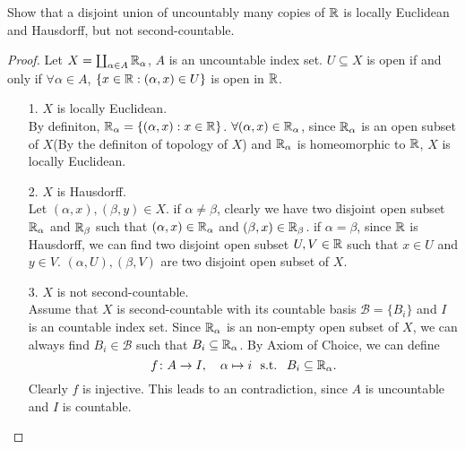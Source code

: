 \begin{problem}
  Show that a disjoint union of uncountably many copies of $\mathbb{R}$ is locally Euclidean and Hausdorff, but not second-countable.
  \begin{proof}
    Let $ X = \coprod_{\alpha \in A}\mathbb{R}_\alpha $, $ A $ is an uncountable index set. $ U \subseteq X $ is open if and only if $ \forall \alpha \in A$, $ \{x\in \mathbb{R}: (\alpha,x)\in U\}$ is open in $\mathbb{R}$.
    \begin{enumerate}
      \item[1.] $X$ is locally Euclidean. \\
      By definiton, $\mathbb{R}_\alpha = \{(\alpha,x): x \in \mathbb{R}\}$. $\forall (\alpha, x) \in \mathbb{R}_\alpha$,  since $\mathbb{R}_\alpha$ is an open subset of $X$(By the definiton of topology of $X$) and $\mathbb{R}_\alpha$ is homeomorphic to $\mathbb{R}$, $X$ is locally Euclidean.
      
      \item[2.] $X$ is Hausdorff. \\
      Let $(\alpha,x),(\beta,y) \in X$. if $\alpha \neq \beta$, clearly we have two disjoint open subset $\mathbb{R}_\alpha$ and $\mathbb{R}_\beta$ such that 
      $ (\alpha,x) \in \mathbb{R}_\alpha $ and $ (\beta,x) \in \mathbb{R}_\beta $. if $\alpha = \beta$, since $\mathbb{R}$ is Hausdorff, we can find two disjoint open subset $U,V \in \mathbb{R}$ such that $x \in U $ and $y \in V$. $(\alpha,U),(\beta,V)$ are two disjoint open subset of $X$.
      
      \item[3.] $X$ is not second-countable. \\
      Assume that $X$ is second-countable with its countable basis $\mathcal{B}=\{B_i\}$ and $I$ is an countable index set. Since $\mathbb{R}_\alpha$ is an non-empty open subset of $X$, we can always find $B_i \in \mathcal{B}$ such that $B_i \subseteq \mathbb{R}_\alpha$. By Axiom of Choice, we can define 
      $$ f \colon A \rightarrow I, \quad  \alpha \mapsto i \ \text{ s.t. } \ B_i \subseteq \mathbb{R}_{\alpha}. $$
      Clearly $f$ is injective. This leads to an contradiction, since $A$ is uncountable and $I$ is countable.
    \end{enumerate}
  \end{proof}
\end{problem}

